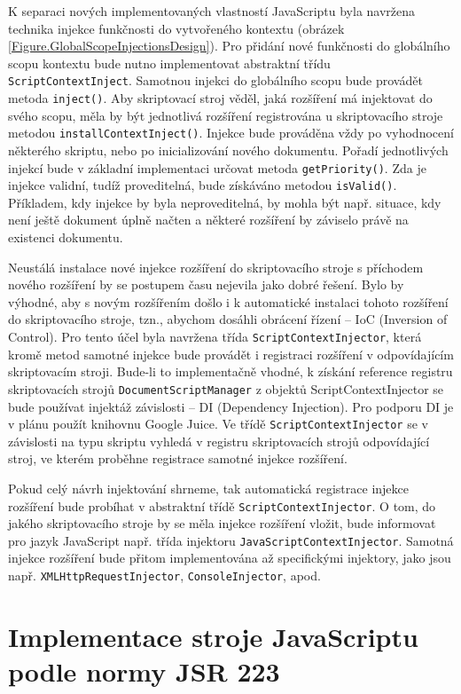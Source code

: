 K separaci nových implementovaných vlastností JavaScriptu byla navržena technika injekce funkčnosti do vytvořeného kontextu (obrázek \ref{Figure.GlobalScopeInjectionsDesign}). Pro přidání nové funkčnosti do globálního scopu kontextu bude nutno implementovat abstraktní třídu \texttt{ScriptContextInject}. Samotnou injekci do globálního scopu bude provádět metoda \texttt{inject()}. Aby skriptovací stroj věděl, jaká rozšíření má injektovat do svého scopu, měla by být jednotlivá rozšíření registrována u skriptovacího stroje metodou \texttt{installContextInject()}. Injekce bude prováděna vždy po vyhodnocení některého skriptu, nebo po inicializování nového dokumentu. Pořadí jednotlivých injekcí bude v základní implementaci určovat metoda \texttt{getPriority()}. Zda je injekce validní, tudíž proveditelná, bude získáváno metodou \texttt{isValid()}. Příkladem, kdy injekce by byla neproveditelná, by mohla být např. situace, kdy není ještě dokument úplně načten a některé rozšíření by záviselo právě na existenci dokumentu.

Neustálá instalace nové injekce rozšíření do skriptovacího stroje s příchodem nového rozšíření by se postupem času nejevila jako dobré řešení. Bylo by výhodné, aby s novým rozšířením došlo i k automatické instalaci tohoto rozšíření do skriptovacího stroje, tzn., abychom dosáhli obrácení řízení -- IoC (Inversion of Control). Pro tento účel byla navržena třída \texttt{ScriptContextInjector}, která kromě metod samotné injekce bude provádět i registraci rozšíření v odpovídajícím skriptovacím stroji. Bude-li to implementačně vhodné, k získání reference registru skriptovacích strojů \texttt{DocumentScriptManager} z objektů ScriptContextInjector se bude používat injektáž závislosti -- DI (Dependency Injection). Pro podporu DI je v plánu použít knihovnu Google Juice. Ve třídě \texttt{ScriptContextInjector} se v závislosti na typu skriptu vyhledá v registru skriptovacích strojů odpovídající stroj, ve kterém proběhne registrace samotné injekce rozšíření. 

Pokud celý návrh injektování shrneme, tak automatická registrace injekce rozšíření bude probíhat v abstraktní třídě \texttt{ScriptContextInjector}. O tom, do jakého skriptovacího stroje by se měla injekce rozšíření vložit, bude informovat pro jazyk JavaScript např. třída injektoru \texttt{JavaScriptContextInjector}. Samotná injekce rozšíření bude přitom implementována až specifickými injektory, jako jsou např. \texttt{XMLHttpRequestInjector}, \texttt{ConsoleInjector}, apod.

\section{Implementace stroje JavaScriptu podle normy JSR 223}
\label{Chapter.Design.JavaScriptEngineJSR223}

